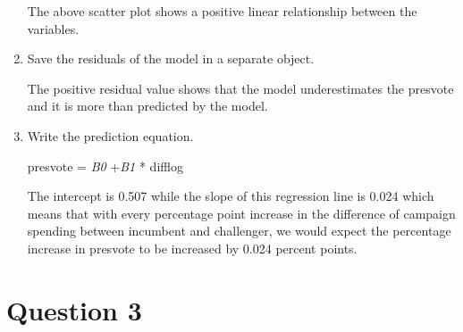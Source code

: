 \documentclass[12pt,letterpaper]{article}
\begin{document}
\begin{enumerate}
		The above scatter plot shows a positive linear relationship between the variables.
		
		\newpage	
		\item Save the residuals of the model in a separate object.
		
		
		
		The positive residual value shows that the model underestimates the presvote  and it is more than predicted by the model. 
		
		
		\item Write the prediction equation.
		
		
		presvote = \textit{B0} +\textit{B1} * difflog
		
		The intercept is 0.507 while the slope of this regression line is 0.024 which means that with every percentage point increase in the difference of campaign spending between incumbent and challenger, we would expect the percentage increase in presvote to be increased by 0.024 percent points.
		
	\end{enumerate}
	
	\newpage	
	
\section*{Question 3}
\end{document}
